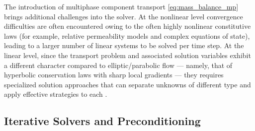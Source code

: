 The introduction of multiphase component transport \eqref{eq:mass_balance_mp} brings additional challenges into the solver.   At the nonlinear level convergence difficulties are often encountered owing to the often highly nonlinear constitutive laws (for example, relative permeability models and complex equations of state), leading to a larger number of linear systems to be solved per time step.   At the linear level, since the transport problem and associated solution variables exhibit a different character compared to elliptic/parabolic flow --- namely, that of hyperbolic conservation laws with sharp local gradients --- they requires specialized solution approaches that can separate unknowns of different type and apply effective strategies to each \cite{Wallis1983,Kwok2007,Klevtsov2016,White2019}.

\subsection{Iterative Solvers and Preconditioning}
\label{subsec:intro_problem_preconditioning}

